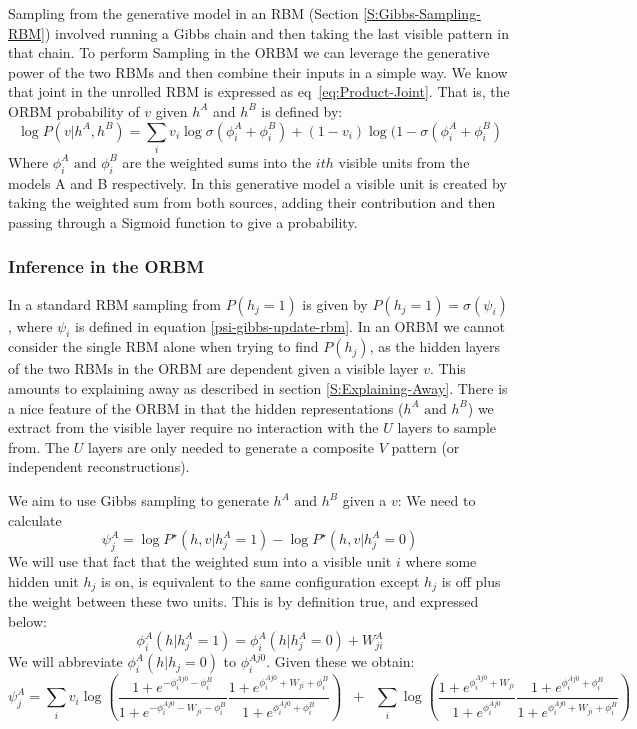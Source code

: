 Sampling from the generative model in an RBM (Section \ref{S:Gibbs-Sampling-RBM}) involved running a Gibbs chain and then taking the last visible pattern in that chain. To perform Sampling in the ORBM we can leverage the generative power of the two RBMs and then combine their inputs in a simple way.
We know that joint in the unrolled RBM is expressed as eq~\ref{eq:Product-Joint}.
That is, the ORBM probability of $v$ given $h^{A} $ and $h^{B}$ is defined by:
$$ \log P(v|h^A,h^B) = \sum_i v_i \log \sigma (\phi^A_i + \phi^B_i) + (1-v_i) \log (1 - \sigma(\phi^A_i + \phi^B_i)$$
Where $\phi_i^A \text{ and } \phi_i^B $ are the weighted sums into the $ ith$ visible units from the models A and B respectively. In this generative model a visible unit is created by taking the weighted sum from both sources, adding their contribution and then passing through a Sigmoid function to give a probability.

\subsubsection{Inference in the ORBM}

In a standard RBM sampling from $P(h_j=1)$ is given by $P(h_j=1) = \sigma(\psi_i)$, where $\psi_i$ is defined in equation \ref{psi-gibbs-update-rbm}. In an ORBM we cannot consider the single RBM alone when trying to find $P(h_j)$, as the hidden layers of the two RBMs in the ORBM are dependent given a visible layer $v$. This amounts to explaining away as described in section \ref{S:Explaining-Away}. There is a nice feature of the ORBM in that the hidden representations ($ h^A \text{ and } h^B $) we extract from the visible layer require no interaction with the $U$ layers to sample from. The $ U $ layers are only needed to generate a composite $ V $ pattern (or independent reconstructions).

We aim to use Gibbs sampling to generate $ h^A \text{ and } h^B $ given a $ v $:
We need to calculate
$$
\psi^A_j = \log P^\star(h,v | h^A_j = 1) - \log P^\star (h,v| h^A_j = 0)
$$
We will use that fact that the weighted sum into a visible unit $i$ where some hidden unit $h_j$ is on, is equivalent to the same configuration except $h_j$ is off plus the weight between these two units. This is by definition true, and expressed below:
$$
\phi^A_i(h | h^A_j=1) = \phi^A_i(h | h^A_j=0) + W^A_{ji}
$$
We will abbreviate $\phi^A_i(h | h_j=0)$ to $\phi^{Aj0}_i$. Given these we obtain:
$$
\psi^A_j = \sum_i v_i \log \left( \frac{1+ e^{-\phi^{Aj0}_i - \phi^B_i}}{1+e^{-\phi^{Aj0}_i - W_{ji} -\phi^B_i}} \frac{1+ e^{\phi^{Aj0}_i + W_{ji} + \phi^B_i}}{1+e^{\phi_i^{Aj0} + \phi^B_i}}\right) \;\;+ \;\;\sum_i \log \left(\frac{1+e^{\phi_i^{Aj0} + W_{ji}}}{1+ e^{\phi_i^{Aj0}}}
\frac{1+e^{\phi_i^{Aj0} + \phi^B_i}}{1+ e^{\phi_i^{Aj0} + W_{ji} + \phi^B_i}} \right)
$$

